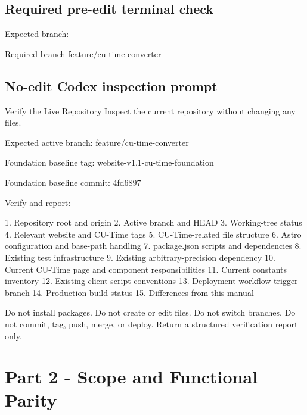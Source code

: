 \documentclass[11pt,letterpaper]{article}
\begin{document}
\subsection{Required pre-edit terminal check}


Expected branch:

\begin{codebox}{Required branch}
feature/cu-time-converter
\end{codebox}

\subsection{No-edit Codex inspection prompt}

\begin{promptbox}{Verify the Live Repository}
Inspect the current repository without changing any files.

Expected active branch:
feature/cu-time-converter

Foundation baseline tag:
website-v1.1-cu-time-foundation

Foundation baseline commit:
4fd6897

Verify and report:

1. Repository root and origin
2. Active branch and HEAD
3. Working-tree status
4. Relevant website and CU-Time tags
5. CU-Time-related file structure
6. Astro configuration and base-path handling
7. package.json scripts and dependencies
8. Existing test infrastructure
9. Existing arbitrary-precision dependency
10. Current CU-Time page and component responsibilities
11. Current constants inventory
12. Existing client-script conventions
13. Deployment workflow trigger branch
14. Production build status
15. Differences from this manual

Do not install packages.
Do not create or edit files.
Do not switch branches.
Do not commit, tag, push, merge, or deploy.
Return a structured verification report only.
\end{promptbox}

\section{Part 2 - Scope and Functional Parity}
\end{document}
